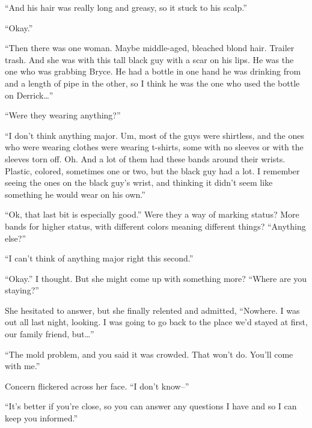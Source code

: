 ``And his hair was really long and greasy, so it stuck to his scalp.''



``Okay.''



``Then there was one woman.  Maybe middle-aged, bleached blond hair.  Trailer trash.  And she was with this tall black guy with a scar on his lips.  He was the one who was grabbing Bryce.  He had a bottle in one hand he was drinking from and a length of pipe in the other, so I think he was the one who used the bottle on Derrick\ldots''



``Were they wearing anything?''



``I don't think anything major.  Um, most of the guys were shirtless, and the ones who were wearing clothes were wearing t-shirts, some with no sleeves or with the sleeves torn off.  Oh.  And a lot of them had these bands around their wrists.  Plastic, colored, sometimes one or two, but the black guy had a lot.  I remember seeing the ones on the black guy's wrist, and thinking it didn't seem like something he would wear on his own.''



``Ok, that last bit is especially good.''  Were they a way of marking status?  More bands for higher status, with different colors meaning different things?  ``Anything else?''



``I can't think of anything major right this second.''



``Okay.''  I thought.  But she might come up with something more?  ``Where are you staying?''



She hesitated to answer, but she finally relented and admitted, ``Nowhere.  I was out all last night, looking.  I was going to go back to the place we'd stayed at first, our family friend, but\ldots''



``The mold problem, and you said it was crowded.  That won't do.  You'll come with me.''



Concern flickered across her face.  ``I don't know--''



``It's better if you're close, so you can answer any questions I have and so I can keep you informed.''



